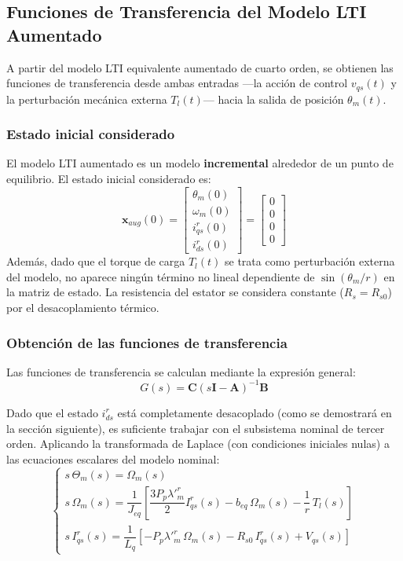 \documentclass[12pt, a4paper,journal, onecolumn, compsoc]{IEEEtran}
\begin{document}
\subsection{Funciones de Transferencia del Modelo LTI Aumentado}
A partir del modelo LTI equivalente aumentado de cuarto orden, se obtienen las funciones de transferencia desde ambas entradas ---la acción de control $v_{qs}(t)$ y la perturbación mecánica externa $T_l(t)$--- hacia la salida de posición $\theta_m(t)$.

\subsubsection{Estado inicial considerado}
El modelo LTI aumentado es un modelo \textbf{incremental} alrededor de un punto de equilibrio. El estado inicial considerado es:
\begin{equation}
    \bm{x}_{aug}(0) = \begin{bmatrix} \theta_m(0) \\ \omega_m(0) \\ i_{qs}^r(0) \\ i_{ds}^r(0) \end{bmatrix} = \begin{bmatrix} 0 \\ 0 \\ 0 \\ 0 \end{bmatrix}
\end{equation}
Además, dado que el torque de carga $T_l(t)$ se trata como perturbación externa del modelo, no aparece ningún término no lineal dependiente de $\sin(\theta_m/r)$ en la matriz de estado. La resistencia del estator se considera constante ($R_s = R_{s0}$) por el desacoplamiento térmico.

\subsubsection{Obtención de las funciones de transferencia}
Las funciones de transferencia se calculan mediante la expresión general:
\begin{equation}
    G(s) = \bm{C}(s\bm{I} - \bm{A})^{-1}\bm{B}
\end{equation}

Dado que el estado $i_{ds}^r$ está completamente desacoplado (como se demostrará en la sección siguiente), es suficiente trabajar con el subsistema nominal de tercer orden. Aplicando la transformada de Laplace (con condiciones iniciales nulas) a las ecuaciones escalares del modelo nominal:
\begin{equation}
\begin{cases}
    s\,\Theta_m(s) = \Omega_m(s) \\[6pt]
    s\,\Omega_m(s) = \dfrac{1}{J_{eq}}\left[\dfrac{3 P_p \lambda'^r_m}{2} I_{qs}^r(s) - b_{eq}\,\Omega_m(s) - \dfrac{1}{r}\,T_l(s)\right] \\[6pt]
    s\,I_{qs}^r(s) = \dfrac{1}{L_q}\left[-P_p \lambda'^r_m\,\Omega_m(s) - R_{s0}\,I_{qs}^r(s) + V_{qs}(s)\right]
\end{cases}
\end{equation}
\end{document}

